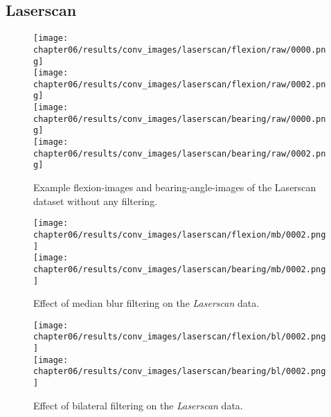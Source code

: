 \subsection{Laserscan}\label{sec:laserscan_conversions}
\begin{figure}[H]
    \texttt{[image: chapter06/results/conv\_images/laserscan/flexion/raw/0000.png]}\\
    \texttt{[image: chapter06/results/conv\_images/laserscan/flexion/raw/0002.png]}\\
    \texttt{[image: chapter06/results/conv\_images/laserscan/bearing/raw/0000.png]}\\
    \texttt{[image: chapter06/results/conv\_images/laserscan/bearing/raw/0002.png]}
    \caption[Examples of the \emph{Laserscan} feature image conversions]{Example \glspl{flexion-image} and \glspl{bearing-angle-image} of the Laserscan dataset without any filtering.}
\end{figure}
\begin{figure}[H]
    \texttt{[image: chapter06/results/conv\_images/laserscan/flexion/mb/0002.png]}\\
    \texttt{[image: chapter06/results/conv\_images/laserscan/bearing/mb/0002.png]}%
    \caption{Effect of median blur filtering on the \emph{Laserscan} data.}
\end{figure}
\begin{figure}[H]
    \texttt{[image: chapter06/results/conv\_images/laserscan/flexion/bl/0002.png]}\\
    \texttt{[image: chapter06/results/conv\_images/laserscan/bearing/bl/0002.png]}%
    \caption{Effect of bilateral filtering on the \emph{Laserscan} data.}
\end{figure}
